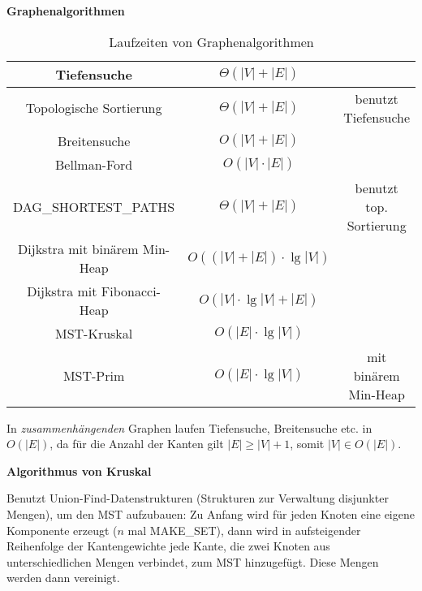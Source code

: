 \documentclass{letter}
\newcommand{\paragraph}[1]{\smallskip

\noindent\textbf{#1}}
\newcommand{\subsection}[1]{\medskip\bigskip

\noindent\textbf{\Large #1}}
\newcommand{\tmem}[1]{{\em #1\/}}
\begin{document}
\subsection{Graphenalgorithmen}

\begin{table}[h]
  \begin{tabular}{|c|c|c|}
    \hline
    Tiefensuche & $\Theta \left( \left| V \right| + \left| E \right| \right)$
    & \\
    \hline
    Topologische Sortierung & $\Theta \left( \left| V \right| + \left| E
    \right| \right)$ & benutzt Tiefensuche\\
    \hline
    Breitensuche & $O \left( \left| V \right| + \left| E \right| \right)$ & \\
    \hline
    Bellman-Ford & $O \left( \left| V \right| \cdot \left| E \right| \right)$
    & \\
    \hline
    DAG\_SHORTEST\_PATHS & $\Theta \left( \left| V \right| + \left| E \right|
    \right)$ & benutzt top. Sortierung\\
    \hline
    Dijkstra mit bin\"arem Min-Heap & $O \left( \left( \left| V \right| +
    \left| E \right| \right) \cdot \lg \left| V \right| \right)$ & \\
    \hline
    Dijkstra mit Fibonacci-Heap & $O \left( \left| V \right| \cdot \lg \left|
    V \right| + \left| E \right| \right)$ & \\
    \hline
    MST-Kruskal & $O \left( \left| E \right| \cdot \lg \left| V \right|
    \right)$ & \\
    \hline
    MST-Prim & $O \left( \left| E \right| \cdot \lg \left| V \right| \right)$
    & mit bin\"arem Min-Heap\\
    \hline
  \end{tabular}
  \caption{Laufzeiten von Graphenalgorithmen}
\end{table}

In {\tmem{zusammenh\"angenden}} Graphen laufen Tiefensuche, Breitensuche etc.
in $O \left( \left| E \right| \right)$, da f\"ur die Anzahl der Kanten gilt
$\left| E \right| \geqslant \left| V \right| + 1$, somit $\left| V \right| \in
O \left( \left| E \right| \right)$.

\paragraph{Algorithmus von Kruskal}

Benutzt Union-Find-Datenstrukturen (Strukturen zur Verwaltung disjunkter
Mengen), um den MST aufzubauen: Zu Anfang wird f\"ur jeden Knoten eine eigene
Komponente erzeugt ($n$ mal MAKE\_SET), dann wird in aufsteigender Reihenfolge
der Kantengewichte jede Kante, die zwei Knoten aus unterschiedlichen Mengen
verbindet, zum MST hinzugef\"ugt. Diese Mengen werden dann vereinigt.
\end{document}
